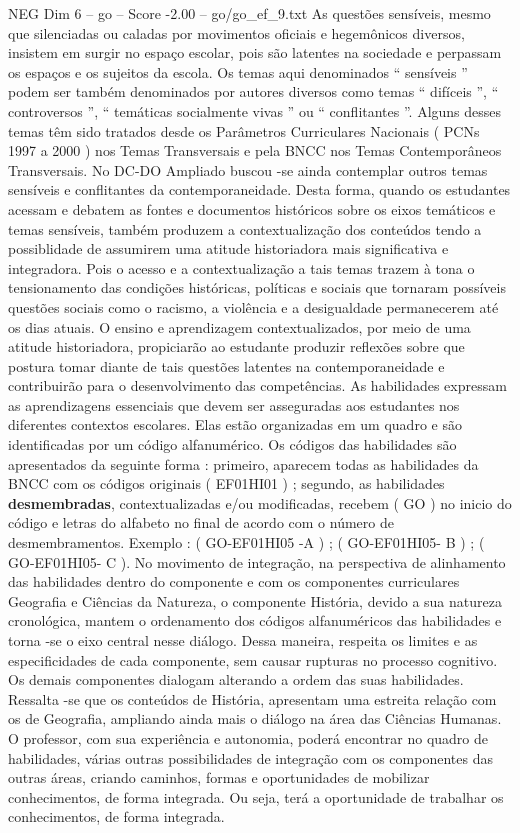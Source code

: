 \begin{textsample}{NEG Dim 6 – go – Score -2.00 – go/go\_ef\_9.txt}
As questões sensíveis, mesmo que silenciadas ou caladas por movimentos oficiais e hegemônicos diversos, insistem em surgir no espaço escolar, pois são latentes na sociedade e perpassam os espaços e os sujeitos da escola.
Os temas aqui denominados “ sensíveis ” podem ser também denominados por autores diversos como temas “ difíceis ”, “ controversos ”, “ temáticas socialmente vivas ” ou “ conflitantes ”.
Alguns desses temas têm sido tratados desde os Parâmetros Curriculares Nacionais ( PCNs 1997 a 2000 ) nos Temas Transversais e pela BNCC nos Temas Contemporâneos Transversais.
No DC-DO Ampliado buscou -se ainda contemplar outros temas sensíveis e conflitantes da contemporaneidade.
Desta forma, quando os estudantes acessam e debatem as fontes e documentos históricos sobre os eixos temáticos e temas sensíveis, também produzem a contextualização dos conteúdos tendo a possiblidade de assumirem uma atitude historiadora mais significativa e integradora.
Pois o acesso e a contextualização a tais temas trazem à tona o tensionamento das condições históricas, políticas e sociais que tornaram possíveis questões sociais como o racismo, a violência e a desigualdade permanecerem até os dias atuais.
O ensino e aprendizagem contextualizados, por meio de uma atitude historiadora, propiciarão ao estudante produzir reflexões sobre que postura tomar diante de tais questões latentes na contemporaneidade e contribuirão para o desenvolvimento das competências.
As habilidades expressam as aprendizagens essenciais que devem ser asseguradas aos estudantes nos diferentes contextos escolares.
Elas estão organizadas em um quadro e são identificadas por um código alfanumérico.
Os códigos das habilidades são apresentados da seguinte forma : primeiro, aparecem todas as habilidades da BNCC com os códigos originais ( EF01HI01 ) ; segundo, as habilidades \textbf{desmembradas}, contextualizadas e/ou modificadas, recebem ( GO ) no inicio do código e letras do alfabeto no final de acordo com o número de desmembramentos.
Exemplo : ( GO-EF01HI05 -A ) ; ( GO-EF01HI05- B ) ; ( GO-EF01HI05- C ).
No movimento de integração, na perspectiva de alinhamento das habilidades dentro do componente e com os componentes curriculares Geografia e Ciências da Natureza, o componente História, devido a sua natureza cronológica, mantem o ordenamento dos códigos alfanuméricos das habilidades e torna -se o eixo central nesse diálogo.
Dessa maneira, respeita os limites e as especificidades de cada componente, sem causar rupturas no processo cognitivo.
Os demais componentes dialogam alterando a ordem das suas habilidades.
Ressalta -se que os conteúdos de História, apresentam uma estreita relação com os de Geografia, ampliando ainda mais o diálogo na área das Ciências Humanas.
O professor, com sua experiência e autonomia, poderá encontrar no quadro de habilidades, várias outras possibilidades de integração com os componentes das outras áreas, criando caminhos, formas e oportunidades de mobilizar conhecimentos, de forma integrada.
Ou seja, terá a oportunidade de trabalhar os conhecimentos, de forma integrada.

\end{textsample}
